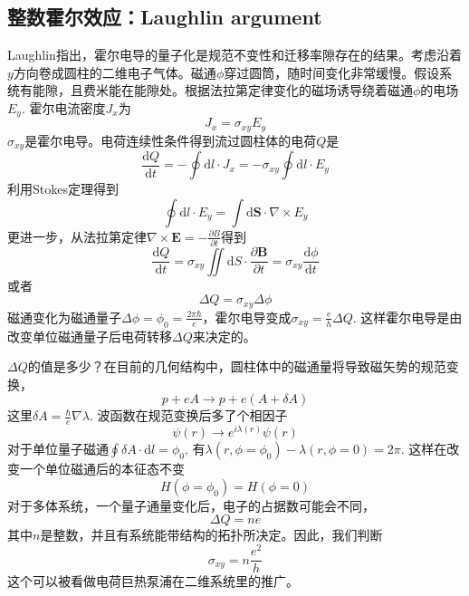 \documentclass{article}
\numberwithin{equation}{subsection}
\begin{document}
\subsection{整数霍尔效应：Laughlin argument}
Laughlin指出，霍尔电导的量子化是规范不变性和迁移率隙存在的结果。考虑沿着$y$方向卷成圆柱的二维电子气体。磁通$\phi$穿过圆筒，随时间变化非常缓慢。假设系统有能隙，且费米能在能隙处。根据法拉第定律变化的磁场诱导绕着磁通$\phi$的电场$E_y$. 霍尔电流密度$J_x$为
\begin{equation}
    J_x=\sigma_{xy}E_y
\end{equation}
$\sigma_{xy}$是霍尔电导。电荷连续性条件得到流过圆柱体的电荷$Q$是
\begin{equation}
    \frac{\mathrm{d}Q}{\mathrm{d}t}=-\oint\mathrm{d}l\cdot J_x=-\sigma_{xy}\oint\mathrm{d}l\cdot E_y
\end{equation}
利用Stokes定理得到
\begin{equation}
    \oint \mathrm{d} l \cdot E_{y}=\int \mathrm{d} \mathbf{S} \cdot \nabla \times E_{y}
\end{equation}
更进一步，从法拉第定律$\nabla\times \mathbf{E}=-\frac{\partial B}{\partial t}$得到
\begin{equation}
    \frac{\mathrm{d}Q}{\mathrm{d}t}=\sigma_{xy}\iint\mathrm{d}S\cdot\frac{\partial\mathbf{B}}{\partial t}=\sigma_{xy}\frac{\mathrm{d}\phi}{\mathrm{d}t}
\end{equation}
或者
\begin{equation}
    \Delta Q=\sigma_{xy}\Delta \phi
\end{equation}
磁通变化为磁通量子$\Delta\phi=\phi_0=\frac{2\pi\hbar}{e}$，霍尔电导变成$\sigma_{xy}=\frac{e}{h}\Delta Q$. 这样霍尔电导是由改变单位磁通量子后电荷转移$\Delta Q$来决定的。

$\Delta Q$的值是多少？在目前的几何结构中，圆柱体中的磁通量将导致磁矢势的规范变换，
\begin{equation}
    p+eA\rightarrow p+e(A+\delta A)
\end{equation}
这里$\delta A=\frac{\hbar}{e}\nabla\lambda$. 波函数在规范变换后多了个相因子
\begin{equation}
    \psi(r)\rightarrow e^{i\lambda(r)}\psi(r)
\end{equation}
对于单位量子磁通$\oint \delta A\cdot\mathrm{d}l=\phi_0$, 有$\lambda(r,\phi=\phi_0)-\lambda(r,\phi=0)=2\pi$. 这样在改变一个单位磁通后的本征态不变
\begin{equation}
    H(\phi=\phi_0)=H(\phi=0)
\end{equation}
对于多体系统，一个量子通量变化后，电子的占据数可能会不同，
\begin{equation}
    \Delta Q=ne
\end{equation}
其中$n$是整数，并且有系统能带结构的拓扑所决定。因此，我们判断
\begin{equation}
    \sigma_{xy}=n\frac{e^2}{h}
\end{equation}
这个可以被看做电荷巨热泵浦在二维系统里的推广。
\end{document}
